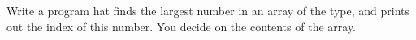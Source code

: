 Write a program hat finds the largest number in an array of the  type, and prints out the index of this number. You decide on the contents of the array.
